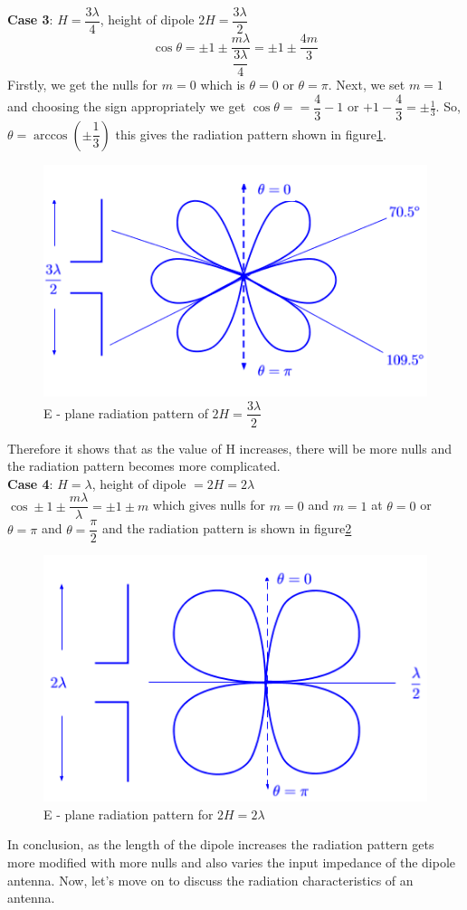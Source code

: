 \textbf{Case 3}: $H = \dfrac{3\lambda}{4}$, height of dipole $2H = \dfrac{3\lambda}{2}$\\
$$\cos \theta = \pm1 \pm \dfrac{m\lambda}{\dfrac{3\lambda}{4}} = \pm 1\pm \dfrac{4m}{3}$$
Firstly, we get the nulls for $m=0$ which is $\theta = 0$ or $\theta = \pi$. Next, we set $m=1$ and choosing the sign appropriately we get $\cos \theta = =\dfrac{4}{3} - 1$ or $+1-\dfrac{4}{3}=\pm\frac{1}{3}$. So, $\theta = \arccos(\pm \dfrac{1}{3})$
this gives the radiation pattern shown in figure\ref{figure6}.
\begin{figure}[h]
\centering
\includegraphics[width=1\linewidth]{"./graphics/fig 6 lec 48"}
\caption{E - plane radiation pattern of $2H = \dfrac{3\lambda}{2}$}
\label{figure6}
\end{figure}

Therefore it shows that as the value of H increases, there will be more nulls and the radiation pattern becomes more complicated.\\
\textbf{Case 4}: $H = \lambda$, height of dipole $ =2H = 2\lambda$\\
$\cos \pm 1 \pm \dfrac{m\lambda}{\lambda} = \pm1 \pm m$ which gives nulls for $m = 0$ and $m= 1$ at $\theta =0$ or $\theta = \pi$ and $\theta = \dfrac{\pi}{2}$ and the radiation pattern is shown in figure\ref{figure7}
\begin{figure}[h]
\centering
\includegraphics[width=1\linewidth]{"./graphics/fig 7 eplane"}
\caption{E - plane radiation pattern for $2H = 2\lambda$}
\label{figure7}
\end{figure}

In conclusion, as the length of the dipole increases the radiation pattern gets more modified with more nulls and also varies the input impedance of the dipole antenna. Now, let's move on to discuss the radiation characteristics of an antenna.